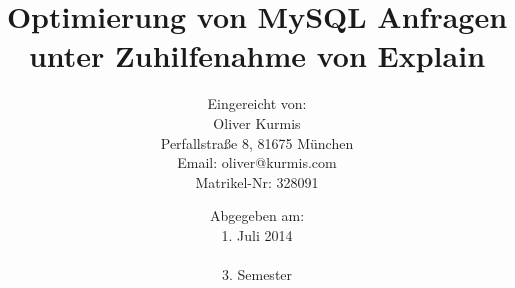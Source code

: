 
\begin{titlepage}
\titlehead{\LARGE \textsc{FOM München\\\large Fachbereich Wirtschaftsinformatik}}
\subject{\vspace{1cm}Seminararbeit}
\title{Optimierung von MySQL Anfragen unter Zuhilfenahme von Explain}
\author{
 {\normalsize Eingereicht von:}
   \\Oliver Kurmis\\
  {\normalsize Perfallstraße 8, 81675 München}\\
  {\normalsize Email: oliver@kurmis.com}\\
  {\normalsize Matrikel-Nr: 328091}
}
\date{{\normalsize Abgegeben am:}\\1. Juli 2014\\\\3. Semester}


\end{titlepage}

\maketitle 